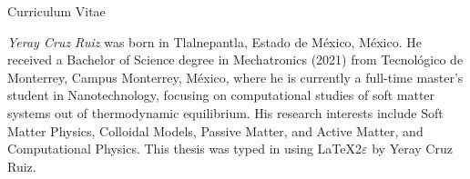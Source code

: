 \huge{Curriculum Vitae} \\
\normalsize
\vspace*{1.0 cm}


\emph{Yeray Cruz Ruiz} was born in Tlalnepantla, Estado de México, México. He received a Bachelor of Science degree in Mechatronics (2021) from Tecnológico de Monterrey, Campus Monterrey, México, where he is currently a full-time master's student in Nanotechnology, focusing on computational studies of soft matter systems out of thermodynamic equilibrium. His research interests include Soft Matter Physics, Colloidal Models, Passive Matter, and Active Matter,  and Computational Physics. 
\vfill
This thesis was typed in using \LaTeX2$\varepsilon$ by Yeray Cruz Ruiz.
